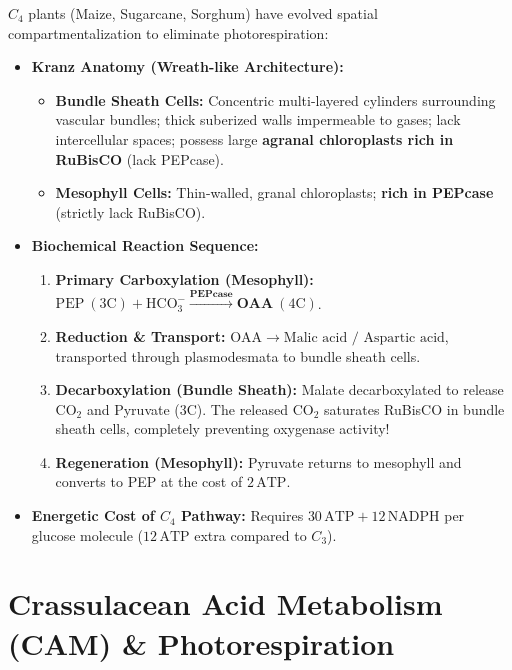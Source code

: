 \documentclass[10pt,twoside,openright]{book}
\begin{document}
\begin{conceptbox}
$C_4$ plants (Maize, Sugarcane, Sorghum) have evolved spatial compartmentalization to eliminate photorespiration:
\begin{itemize}[leftmargin=*]
  \item \textbf{Kranz Anatomy (Wreath-like Architecture):}
  \begin{itemize}
    \item \textbf{Bundle Sheath Cells:} Concentric multi-layered cylinders surrounding vascular bundles; thick suberized walls impermeable to gases; lack intercellular spaces; possess large \textbf{agranal chloroplasts rich in RuBisCO} (lack PEPcase).
    \item \textbf{Mesophyll Cells:} Thin-walled, granal chloroplasts; \textbf{rich in PEPcase} (strictly lack RuBisCO).
  \end{itemize}
  \item \textbf{Biochemical Reaction Sequence:}
  \begin{enumerate}
    \item \textbf{Primary Carboxylation (Mesophyll):} $\mathrm{PEP}\ (3\mathrm{C}) + \mathrm{HCO_3^-} \xrightarrow{\mathbf{PEPcase}} \mathbf{OAA}\ (4\mathrm{C})$.
    \item \textbf{Reduction \& Transport:} $\mathrm{OAA} \to \text{Malic acid / Aspartic acid}$, transported through plasmodesmata to bundle sheath cells.
    \item \textbf{Decarboxylation (Bundle Sheath):} Malate decarboxylated to release $\mathrm{CO}_2$ and Pyruvate (3C). The released $\mathrm{CO}_2$ saturates RuBisCO in bundle sheath cells, completely preventing oxygenase activity!
    \item \textbf{Regeneration (Mesophyll):} Pyruvate returns to mesophyll and converts to PEP at the cost of $2\,\mathrm{ATP}$.
  \end{enumerate}
  \item \textbf{Energetic Cost of $C_4$ Pathway:} Requires \textbf{$30\,\mathrm{ATP} + 12\,\mathrm{NADPH}$} per glucose molecule ($12\,\mathrm{ATP}$ extra compared to $C_3$).
\end{itemize}
\end{conceptbox}

\section{Crassulacean Acid Metabolism (CAM) \& Photorespiration}
\end{document}
